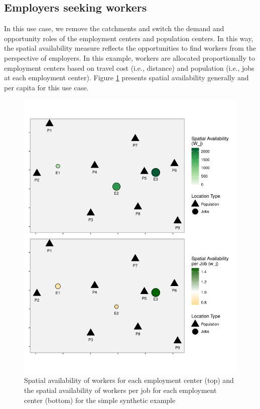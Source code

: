 \documentclass[]{elsarticle} %
\begin{document}
\hypertarget{employers-seeking-workers}{%
\subsection{Employers seeking workers}\label{employers-seeking-workers}}

In this use case, we remove the catchments and switch the demand and
opportunity roles of the employment centers and population centers. In
this way, the spatial availability measure reflects the opportunities to
find workers from the perspective of employers. In this example, workers
are allocated proportionally to employment centers based on travel cost
(i.e., distance) and population (i.e., jobs at each employment center).
Figure \ref{fig:toy-example-availability-workers-per-job} presents
spatial availability generally and per capita for this use case.

\begin{figure}
\includegraphics[width=1\linewidth]{Spatial-Availability_files/figure-latex/toy-example-availability-workers-per-job-1} \caption{\label{fig:toy-example-availability-workers-per-job} Spatial availability of workers for each employment center (top) and the spatial availability of workers per job for each employment center (bottom) for the simple synthetic example}\label{fig:toy-example-availability-workers-per-job}
\end{figure}
\end{document}
